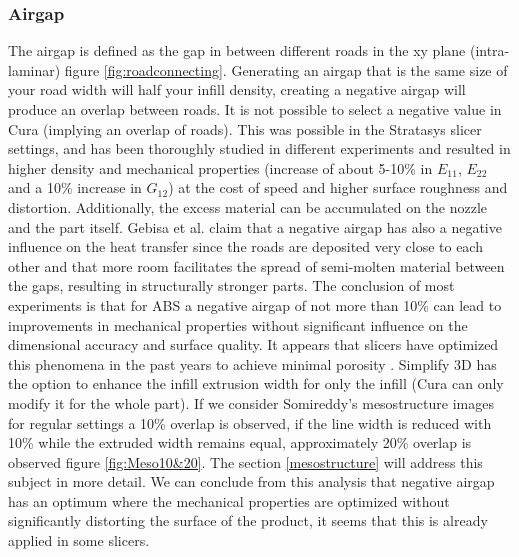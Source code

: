 \subsubsection{Airgap}
The airgap is defined as the gap in between different roads in the xy plane (intra-laminar)  figure \ref{fig:roadconnecting}. Generating an airgap that is the same size of your road width will half your infill density, creating a negative airgap will produce an overlap between roads. It is not possible to select a negative value in Cura (implying an overlap of roads). This was possible in the Stratasys slicer settings, and has been thoroughly studied in different experiments \cite{Somireddy2017MechanicalMesostructure,Rodriguez2001MechanicalInvestigation,Ahn2002AnisotropicABS,Dawoud2016MechanicalTechniques,Gebisa2018InvestigatingExperiment,HossainImprovingParameters}
and resulted in higher density and mechanical properties (increase of about 5-10\% in $E_{11}$, $E_{22}$ and a 10\% increase in $G_{12}$) at the cost of speed and higher surface roughness and distortion. Additionally, the excess material can be accumulated on the nozzle and the part itself. Gebisa et al. \cite{Gebisa2018InvestigatingExperiment} claim that a negative airgap has also a negative influence on the heat transfer since the roads are deposited very close to each other and that more room facilitates the spread of semi-molten material between the gaps, resulting in structurally stronger parts. The conclusion of most experiments is that for ABS a negative airgap of not more than 10\% can lead to improvements in mechanical properties without significant influence on the dimensional accuracy and surface quality. It appears that  slicers have optimized this phenomena in the past years to achieve minimal porosity \cite{GaryHodgsonSlic3rMath}. Simplify 3D has the option to enhance the infill extrusion width for only the infill (Cura can only modify it for the whole part).
If we consider Somireddy's \cite{Somireddy2017MechanicalMesostructure} mesostructure images for regular settings a 10\% overlap is observed,  if the line width is reduced with 10\% while the extruded width remains equal,  approximately 20\% overlap is observed figure \ref{fig:Meso10&20}. The section \ref{mesostructure} will address this subject in more detail.
We can conclude from this analysis that negative airgap has an optimum where the mechanical properties are optimized without significantly distorting the surface of the product, it seems that this is already applied in some slicers. 

